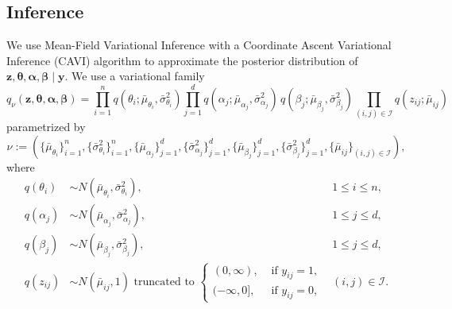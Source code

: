 \documentclass[12pt]{article}
\begin{document}
\subsection*{Inference}

We use Mean-Field Variational Inference with a Coordinate Ascent Variational
Inference (CAVI) algorithm to approximate the posterior distribution of
$\bm{z}, \bm{\theta}, \bm{\alpha}, \bm{\beta} \mid \bm{y}$.
We use a variational family \[
    q_\nu(\bm{z}, \bm{\theta}, \bm{\alpha}, \bm{\beta})
        = \prod_{i = 1}^n q(\theta_i; \bar{\mu}_{\theta_i}, \bar{\sigma}_{\theta_i}^2)
            \prod_{j = 1}^d q(\alpha_j; \bar{\mu}_{\alpha_j}, \bar{\sigma}_{\alpha_j}^2)\,
                q(\beta_j; \bar{\mu}_{\beta_j}, \bar{\sigma}_{\beta_j}^2)
            \prod_{(i, j) \in \mathscr{I}} q(z_{ij}; \bar{\mu}_{ij})
\] parametrized by \[
    \nu := (
        \{\bar{\mu}_{\theta_i}\}_{i = 1}^n, \{\bar{\sigma}_{\theta_i}^2\}_{i = 1}^n,
        \{\bar{\mu}_{\alpha_j}\}_{j = 1}^d, \{\bar{\sigma}_{\alpha_j}^2\}_{j = 1}^d,
        \{\bar{\mu}_{\beta_j}\}_{j = 1}^d, \{\bar{\sigma}_{\beta_j}^2\}_{j = 1}^d,
        \{\bar{\mu}_{ij}\}_{(i, j) \in \mathscr{I}}
    ),
\] where \begin{align*}
    q(\theta_i) &\sim N(\bar{\mu}_{\theta_i}, \bar{\sigma}_{\theta_i}^2), \quad& 1 \leq i \leq n, \\
    q(\alpha_j) &\sim N(\bar{\mu}_{\alpha_j}, \bar{\sigma}_{\alpha_j}^2), & 1 \leq j \leq d, \\
    q(\beta_j) &\sim N(\bar{\mu}_{\beta_j}, \bar{\sigma}_{\beta_j}^2), & 1 \leq j \leq d, \\
    q(z_{ij}) &\sim N(\bar{\mu}_{ij}, 1) \text{ truncated to } \begin{cases}
        (0, \infty), &\text{ if } y_{ij} = 1, \\
        (-\infty, 0], &\text{ if } y_{ij} = 0,
    \end{cases} &(i, j) \in \mathscr{I}.
\end{align*}
\end{document}
